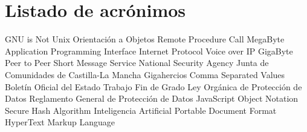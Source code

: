 \chapter{Listado de acrónimos}

{\small
\begin{acronym}[XXXXXXXX]
       {\acs{GNU} is Not Unix}
        {Orientación a Objetos}
       {Remote Procedure Call}
        {MegaByte}
       {Application Programming Interface}
        {Internet Protocol}
      {Voice over \acs{IP}}
        {GigaByte}
       {Peer to Peer}
       {Short Message Service}
       {National Security Agency}
      {Junta de Comunidades de Castilla-La Mancha}
  	 {Gigahercios}
       {Comma Separated Values}
       {Boletín Oficial del Estado}
       {Trabajo Fin de Grado}
     {Ley Orgánica de Protección de Datos}
    {Reglamento General de Protección de Datos}
    {JavaScript Object Notation}
      {Secure Hash Algorithm}
          {Inteligencia Artificial}
      {Portable Document Format}
    {HyperText Markup Language}
\end{acronym}
}





